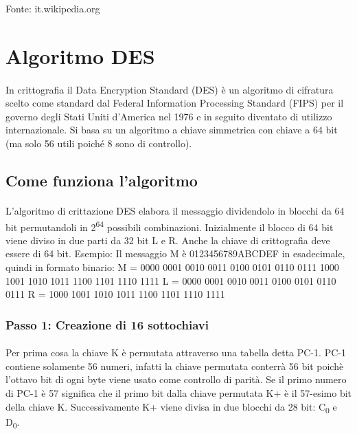 \documentclass{article}
\begin{document}
		\vfill
			Fonte: it.wikipedia.org

		\newpage

	\section{Algoritmo DES}

		\paragraph{}
		In crittografia il Data Encryption Standard (DES) è un algoritmo di cifratura scelto come standard dal Federal Information Processing Standard (FIPS) per il governo degli Stati Uniti d'America nel 1976 e in seguito diventato di utilizzo internazionale. Si basa su un algoritmo a chiave simmetrica con chiave a 64 bit (ma solo 56 utili poiché 8 sono di controllo).

		\subsection{Come funziona l'algoritmo}

			\paragraph{}
			L'algoritmo di crittazione DES elabora il messaggio dividendolo in blocchi da 64 bit permutandoli in 2\textsuperscript{64} possibili combinazioni. Inizialmente il blocco di 64 bit viene diviso in due parti da 32 bit L e R. Anche la chiave di crittografia deve essere di 64 bit.\newline
			Esempio: Il messaggio M è 0123456789ABCDEF in esadecimale, quindi in formato binario: \newline
			M = 0000 0001 0010 0011 0100 0101 0110 0111 1000 1001 1010 1011 1100 1101 1110 1111 \newline
			L = 0000 0001 0010 0011 0100 0101 0110 0111 \newline
			R = 1000 1001 1010 1011 1100 1101 1110 1111
			
			\subsubsection{Passo 1: Creazione di 16 sottochiavi}

				\paragraph{}
				Per prima cosa la chiave K è permutata attraverso una tabella detta PC-1. PC-1 contiene solamente 56 numeri, infatti la chiave permutata conterrà 56 bit poichè l'ottavo bit di ogni byte viene usato come controllo di parità. Se il primo numero di PC-1 è 57 significa che il primo bit dalla chiave permutata K+ è il 57-esimo bit della chiave K. \newline
				Successivamente K+ viene divisa in due blocchi da 28 bit: C\textsubscript{0} e D\textsubscript{0}.
\end{document}
